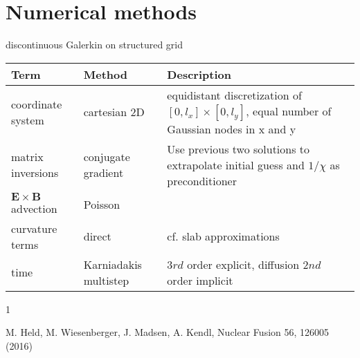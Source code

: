 \documentclass{hitec} %
\renewenvironment{thebibliography}[1]{
  \begin{oldthebibliography}{#1}
    \RaggedRight %
    \setlength{\itemsep}{0em}
    \setlength{\parskip}{0em}
}
{
  \end{oldthebibliography}
}
\newcommand{\ExB}{$\bm{E}\times\bm{B} \,$}
\begin{document}
\section{Numerical methods}
discontinuous Galerkin on structured grid 
\begin{longtable}{ll>{\RaggedRight}p{7cm}}
\toprule
\rowcolor{gray!50}\textbf{Term} &  \textbf{Method} & \textbf{Description}  \\ \midrule
coordinate system & cartesian 2D & equidistant discretization of $[0,l_x] \times [0,l_y]$, equal number of Gaussian nodes in x and y \\
matrix inversions & conjugate gradient & Use previous two solutions to extrapolate initial guess and $1/\chi$ as preconditioner \\
\ExB advection & Poisson & \\
curvature terms & direct & cf. slab approximations \\
time &  Karniadakis multistep & $3rd$ order explicit, diffusion $2nd$ order implicit \\
\bottomrule
\end{longtable}
\begin{thebibliography}{1}
  M. Held, M. Wiesenberger, J. Madsen, A. Kendl,  Nuclear Fusion 56, 126005 (2016)
\end{thebibliography}
\end{document}
